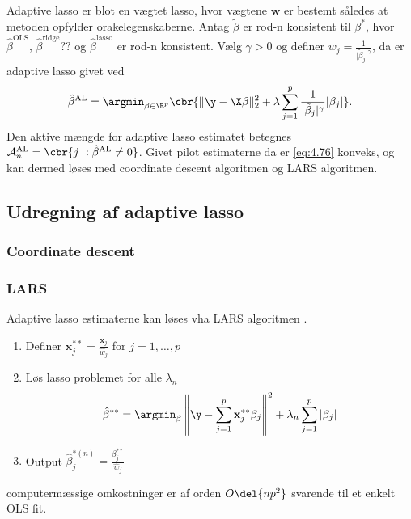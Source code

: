 Adaptive lasso er blot en vægtet lasso, hvor vægtene \(\mathbf{w}\) er bestemt således at metoden opfylder orakelegenskaberne.
Antag \(\tilde{\beta}\) er rod-n konsistent til \(\beta^*\), hvor \(\hat{\beta}^\text{OLS}\), \(\hat{\beta}^\text{ridge}\)?? og \(\hat{\beta}^\text{lasso}\) er rod-n konsistent.
Vælg \(\gamma>0\) og definer \(w_j = \frac{1}{\vert \tilde{\beta}_j \vert^\gamma}\), da er adaptive lasso givet ved
\begin{align}
\hat{\beta}^\text{AL} = \argmin_{\beta \in \R^p} \cbr{ \Vert \y - \X \beta \Vert_2^2 + \lambda \sum_{j=1}^p \frac{1}{\vert \tilde{\beta}_j \vert^\gamma} \vert \beta_j \vert}. \label{eq:4.76}
\end{align}
Den aktive mængde for adaptive lasso estimatet betegnes \(\mathcal{A}_n^\text{AL} = \cbr{j \ : \hat{\beta}^{\text{AL}} \neq 0 }\).
Givet pilot estimaterne da er \eqref{eq:4.76} konveks, og kan dermed løses med coordinate descent algoritmen og LARS algoritmen.
%
\subsection{Udregning af adaptive lasso}

\subsubsection{Coordinate descent}

\subsubsection{LARS}
Adaptive lasso estimaterne kan løses vha LARS algoritmen \citep{efron}.
\begin{enumerate}
\item Definer \(\mathbf{x}_j^{**} = \frac{\mathbf{x}_j}{\hat{w}_j}\) for \(j=1, \ldots, p\)
\item Løs lasso problemet for alle \(\lambda_n\)
\begin{align*}
\hat{\beta}^{**} = \argmin_{\beta} \left\Vert \y - \sum_{j=1}^p \mathbf{x}_j^{**} \beta_j \right\Vert^2 + \lambda_n \sum_{j=1}^p \vert \beta_j \vert
\end{align*}
\item Output \(\hat{\beta}_j^{*(n)} = \frac{\beta_j^{**}}{\hat{w}_j}\)
\end{enumerate}
computermæssige omkostninger er af orden \(O\del{np^2}\) svarende til et enkelt OLS fit.

